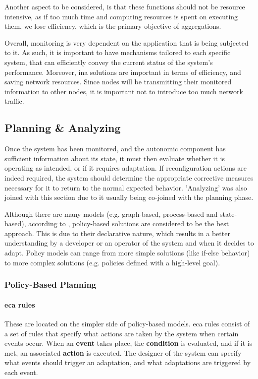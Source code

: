 Another aspect to be considered, is that these functions should not be resource intensive, as if too much time and computing resources is spent on executing them, we lose efficiency, which is the primary objective of aggregations.

Overall, monitoring is very dependent on the application that is being subjected to it. As such, it is important to have mechanisms tailored to each specific system, that can efficiently convey the current status of the system's performance. Moreover, \gls{ina} solutions are important in terms of efficiency, and saving network resources. Since nodes will be transmitting their monitored information to other nodes, it is important not to introduce too much network traffic.
%
%
%
\subsection{Planning \& Analyzing}
\label{ssec:decidingonadaptation}
Once the system has been monitored, and the autonomic component has sufficient information about its state, it must then evaluate whether it is operating as intended, or if it requires adaptation. If reconfiguration actions are indeed required, the system should determine the appropriate corrective measures necessary for it to return to the normal expected behavior. 'Analyzing' was also joined with this section due to it usually being co-joined with the planning phase. 

Although there are many models (e.g. graph-based, process-based and state-based), according to \cite{Rosa2012}, policy-based solutions are considered to be the best approach. This is due to their declarative nature, which results in a better understanding by a developer or an operator of the system and when it decides to adapt. Policy models can range from more simple solutions (like if-else behavior) to more complex solutions (e.g. policies defined with a high-level goal).
%
%
%
\subsubsection{Policy-Based Planning}
\label{sssec:policy_based_planning}

\paragraph{\gls{eca} rules} \label{par:ecarules} These are located on the simpler side of policy-based models. \gls{eca} rules consist of a set of rules that specify what actions are taken by the system when certain events occur. When an \textbf{event} takes place, the \textbf{condition} is evaluated, and if it is met, an associated \textbf{action} is executed\cite{McCarthy1989}. The designer of the system can specify what events should trigger an adaptation, and what adaptations are triggered by each event.

